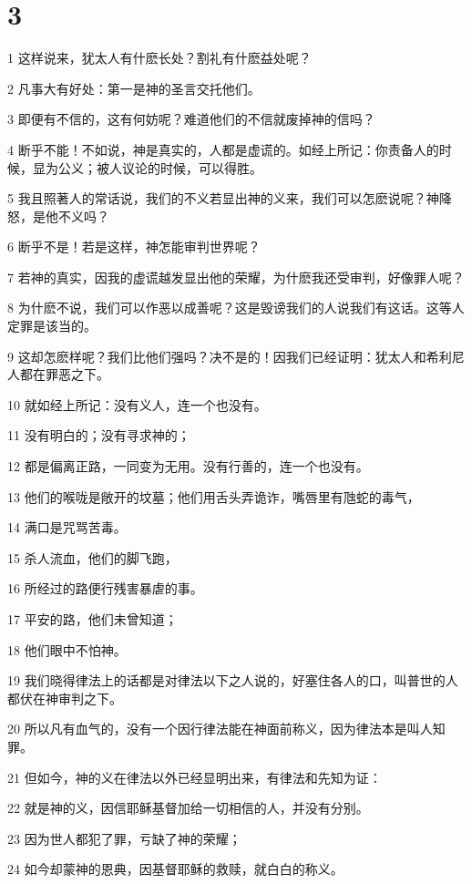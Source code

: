 \chapter{3}

\par 1 这样说来，犹太人有什麽长处？割礼有什麽益处呢？
\par 2 凡事大有好处：第一是神的圣言交托他们。
\par 3 即便有不信的，这有何妨呢？难道他们的不信就废掉神的信吗？
\par 4 断乎不能！不如说，神是真实的，人都是虚谎的。如经上所记：你责备人的时候，显为公义；被人议论的时候，可以得胜。
\par 5 我且照著人的常话说，我们的不义若显出神的义来，我们可以怎麽说呢？神降怒，是他不义吗？
\par 6 断乎不是！若是这样，神怎能审判世界呢？
\par 7 若神的真实，因我的虚谎越发显出他的荣耀，为什麽我还受审判，好像罪人呢？
\par 8 为什麽不说，我们可以作恶以成善呢？这是毁谤我们的人说我们有这话。这等人定罪是该当的。
\par 9 这却怎麽样呢？我们比他们强吗？决不是的！因我们已经证明：犹太人和希利尼人都在罪恶之下。
\par 10 就如经上所记：没有义人，连一个也没有。
\par 11 没有明白的；没有寻求神的；
\par 12 都是偏离正路，一同变为无用。没有行善的，连一个也没有。
\par 13 他们的喉咙是敞开的坟墓；他们用舌头弄诡诈，嘴唇里有虺蛇的毒气，
\par 14 满口是咒骂苦毒。
\par 15 杀人流血，他们的脚飞跑，
\par 16 所经过的路便行残害暴虐的事。
\par 17 平安的路，他们未曾知道；
\par 18 他们眼中不怕神。
\par 19 我们晓得律法上的话都是对律法以下之人说的，好塞住各人的口，叫普世的人都伏在神审判之下。
\par 20 所以凡有血气的，没有一个因行律法能在神面前称义，因为律法本是叫人知罪。
\par 21 但如今，神的义在律法以外已经显明出来，有律法和先知为证：
\par 22 就是神的义，因信耶稣基督加给一切相信的人，并没有分别。
\par 23 因为世人都犯了罪，亏缺了神的荣耀；
\par 24 如今却蒙神的恩典，因基督耶稣的救赎，就白白的称义。
